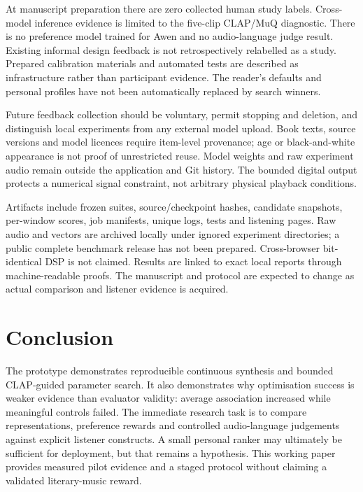 \documentclass[11pt]{article}
\begin{document}
At manuscript preparation there are zero collected human study labels. Cross-model inference evidence is limited to the five-clip CLAP/MuQ diagnostic. There is no preference model trained for Awen and no audio-language judge result. Existing informal design feedback is not retrospectively relabelled as a study. Prepared calibration materials and automated tests are described as infrastructure rather than participant evidence. The reader's defaults and personal profiles have not been automatically replaced by search winners.

Future feedback collection should be voluntary, permit stopping and deletion, and distinguish local experiments from any external model upload. Book texts, source versions and model licences require item-level provenance; age or black-and-white appearance is not proof of unrestricted reuse. Model weights and raw experiment audio remain outside the application and Git history. The bounded digital output protects a numerical signal constraint, not arbitrary physical playback conditions.

Artifacts include frozen suites, source/checkpoint hashes, candidate snapshots, per-window scores, job manifests, unique logs, tests and listening pages. Raw audio and vectors are archived locally under ignored experiment directories; a public complete benchmark release has not been prepared. Cross-browser bit-identical DSP is not claimed. Results are linked to exact local reports through machine-readable proofs. The manuscript and protocol are expected to change as actual comparison and listener evidence is acquired.

\section{Conclusion}
The prototype demonstrates reproducible continuous synthesis and bounded CLAP-guided parameter search. It also demonstrates why optimisation success is weaker evidence than evaluator validity: average association increased while meaningful controls failed. The immediate research task is to compare representations, preference rewards and controlled audio-language judgements against explicit listener constructs. A small personal ranker may ultimately be sufficient for deployment, but that remains a hypothesis. This working paper provides measured pilot evidence and a staged protocol without claiming a validated literary-music reward.
\end{document}
